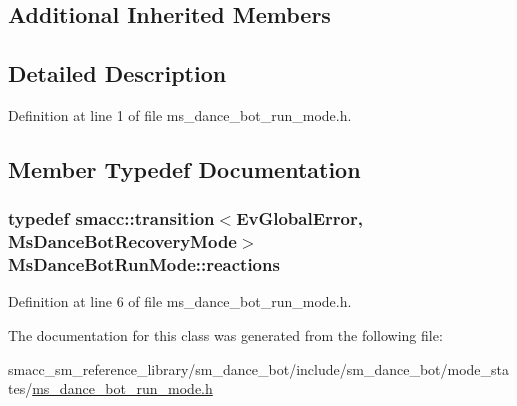 \subsection*{Additional Inherited Members}


\subsection{Detailed Description}


Definition at line 1 of file ms\+\_\+dance\+\_\+bot\+\_\+run\+\_\+mode.\+h.



\subsection{Member Typedef Documentation}
\subsubsection[{\texorpdfstring{reactions}{reactions}}]{\setlength{\rightskip}{0pt plus 5cm}typedef {\bf smacc\+::transition}$<$Ev\+Global\+Error, {\bf Ms\+Dance\+Bot\+Recovery\+Mode}$>$ {\bf Ms\+Dance\+Bot\+Run\+Mode\+::reactions}}\hypertarget{classMsDanceBotRunMode_af334e83af3357221ff972b9af50cad77}{}\label{classMsDanceBotRunMode_af334e83af3357221ff972b9af50cad77}


Definition at line 6 of file ms\+\_\+dance\+\_\+bot\+\_\+run\+\_\+mode.\+h.



The documentation for this class was generated from the following file\+:\begin{DoxyCompactItemize}
\item 
smacc\+\_\+sm\+\_\+reference\+\_\+library/sm\+\_\+dance\+\_\+bot/include/sm\+\_\+dance\+\_\+bot/mode\+\_\+states/\hyperlink{ms__dance__bot__run__mode_8h}{ms\+\_\+dance\+\_\+bot\+\_\+run\+\_\+mode.\+h}\end{DoxyCompactItemize}
